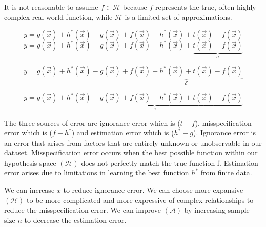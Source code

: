 \documentclass[12pt]{article}
\begin{document}
\begin{enumerate}
It is not reasonable to assume $f \in \mathcal{H}$ because $f$ represents the true, often highly complex real-world function, while $\mathcal{H}$ is a limited set of approximations. 



\[
y = g(\vec{x}) + h^*(\vec{x}) - g(\vec{x}) + f(\vec{x}) - h^*(\vec{x}) + t(\vec{x}) - f(\vec{x})
\]
\[
y = g(\vec{x}) 
    + h^*(\vec{x}) - g(\vec{x})
    + f(\vec{x}) - h^*(\vec{x})
    + \underbrace{t(\vec{x}) - f(\vec{x})}_{{\sigma}}
\]

\[
y = g(\vec{x}) 
    + h^*(\vec{x}) - g(\vec{x})
    + \underbrace{f(\vec{x}) - h^*(\vec{x})
    + t(\vec{x}) - f(\vec{x})}_{\mathcal{E}}
\]

\[
y = g(\vec{x}) 
    + \underbrace{h^*(\vec{x}) - g(\vec{x})
    + f(\vec{x}) - h^*(\vec{x})
    + t(\vec{x}) - f(\vec{x})}_{{e}}
\]

The three sources of error are ignorance error which is ($t-f$), misspecification error which is ($f-h^*$) and estimation error which is ($h^* - g$). Ignorance error is an error that arises from factors that are entirely unknown or unobservable in our dataset. Misspecification error occurs when the best possible function within our hypothesis space $(\mathcal{H})$ does not perfectly match the true function  f.  Estimation error arises due to limitations in learning the best function  $h^*$  from finite data. 



We can increase $x$ to reduce ignorance error. We can choose more expansive $(\mathcal{H})$ to be more complicated and more expressive of complex relationships to reduce the misspecification error. We can improve $(\mathcal{A})$ by increasing sample size $n$  to decrease the estimation error.



\end{enumerate}
\end{document}
